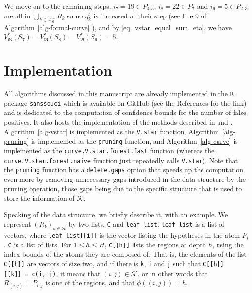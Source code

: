 \documentclass[
  11pt,
  a4paper,
]{article}
\theoremstyle{plain}
\theoremstyle{definition}
\theoremstyle{plain}
\theoremstyle{definition}
\theoremstyle{plain}
\theoremstyle{remark}
\begin{document}
We move on to the remaining steps. \(i_7=19\in P_{4:5}\),
\(i_8=22\in P_{7}\) and \(i_9=5\in P_{2:3}\) are all in
\(\bigcup_{k\in\mathcal{K}^-_6}R_k\) so no \(\eta_k^t\) is increased at
their step (see line 9 of  Algorithm~\ref{alg-formal-curve} ), and by
\eqref{eq_vstar_equal_sum_eta}, we have
\(V^*_{\mathfrak{R}}(S_7)=V^*_{\mathfrak{R}}(S_8)=V^*_{\mathfrak{R}}(S_9)=5\).

\section{Implementation}\label{sec-implementation}

All algorithms discussed in this manuscript are already implemented in
the \texttt{R} \citep{R-base} package \texttt{sanssouci}
\citep{sanssouci} which is available on GitHub (see the References for
the link) and is dedicated to the computation of confidence bounds for
the number of false positives. It also hosts the implementation of the
methods described in \citet{MR4124323} and
\citet{10.1093/bioinformatics/btac693}.  Algorithm~\ref{alg-vstar}  is
implemented as the \texttt{V.star} function,
 Algorithm~\ref{alg-pruning}  is implemented as the \texttt{pruning}
function, and  Algorithm~\ref{alg-curve}  is implemented as the
\texttt{curve.V.star.forest.fast} function (whereas the
\texttt{curve.V.star.forest.naive} function just repeatedly calls
\texttt{V.star}). Note that the \texttt{pruning} function has a
\texttt{delete.gaps} option that speeds up the computation even more by
removing unnecessary gaps introduced in the data structure by the
pruning operation, those gaps being due to the specific structure that
is used to store the information of \(\mathcal{K}\).

Speaking of the data structure, we briefly describe it, with an example.
We represent \((R_k)_{k\in\mathcal{K}}\) by two lists, \texttt{C} and
\texttt{leaf\_list}. \texttt{leaf\_list} is a list of vectors, where
\texttt{leaf\_list{[}{[}i{]}{]}} is the vector listing the hypotheses in
the atom \(P_i\). \texttt{C} is a list of lists. For \(1\leq h\leq H\),
\texttt{C{[}{[}h{]}{]}} lists the regions at depth \(h\), using the
index bounds of the atoms they are composed of. That is, the elements of
the list \texttt{C{[}{[}h{]}{]}} are vectors of size two, and if there
is \texttt{k}, \texttt{i} and \texttt{j} such that
\texttt{C{[}{[}h{]}{]}{[}{[}k{]}{]}\ =\ c(i,\ j)}, it means that
\((i, j)\in\mathcal{K}\), or in other words that \(R_{(i,j)}=P_{i:j}\)
is one of the regions, and that \(\phi((i, j))=h\).
\end{document}
